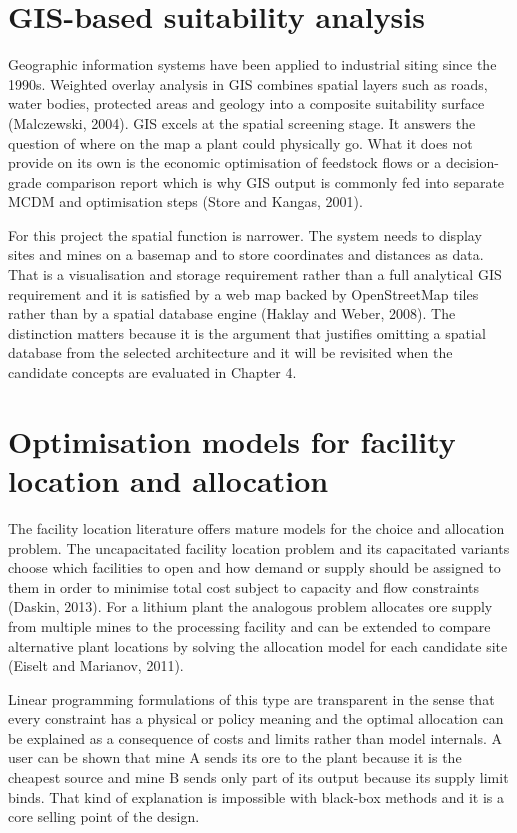 \documentclass[12pt,a4paper]{report}
\begin{document}
\section{GIS-based suitability analysis}
Geographic information systems have been applied to industrial siting
since the 1990s. Weighted overlay analysis in GIS combines spatial
layers such as roads, water bodies, protected areas and geology into a
composite suitability surface (Malczewski, 2004). GIS excels at the
spatial screening stage. It answers the question of where on the map a
plant could physically go. What it does not provide on its own is the
economic optimisation of feedstock flows or a decision-grade comparison
report which is why GIS output is commonly fed into separate MCDM and
optimisation steps (Store and Kangas, 2001).

For this project the spatial function is narrower. The system needs to
display sites and mines on a basemap and to store coordinates and
distances as data. That is a visualisation and storage requirement
rather than a full analytical GIS requirement and it is satisfied by a
web map backed by OpenStreetMap tiles rather than by a spatial database
engine (Haklay and Weber, 2008). The distinction matters because it is
the argument that justifies omitting a spatial database from the
selected architecture and it will be revisited when the candidate
concepts are evaluated in Chapter 4.

\section{Optimisation models for facility location and allocation}
The facility location literature offers mature models for the choice
and allocation problem. The uncapacitated facility location problem and
its capacitated variants choose which facilities to open and how demand
or supply should be assigned to them in order to minimise total cost
subject to capacity and flow constraints (Daskin, 2013). For a lithium
plant the analogous problem allocates ore supply from multiple mines to
the processing facility and can be extended to compare alternative
plant locations by solving the allocation model for each candidate site
(Eiselt and Marianov, 2011).

Linear programming formulations of this type are transparent in the
sense that every constraint has a physical or policy meaning and the
optimal allocation can be explained as a consequence of costs and
limits rather than model internals. A user can be shown that mine A
sends its ore to the plant because it is the cheapest source and mine B
sends only part of its output because its supply limit binds. That
kind of explanation is impossible with black-box methods and it is a
core selling point of the design.
\end{document}
